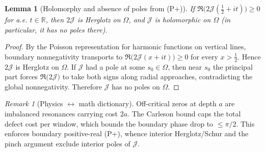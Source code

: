 \documentclass[11pt]{article}
\newtheorem{lemma}[theorem]{Lemma}
\theoremstyle{definition}
\theoremstyle{remark}
\newtheorem{remark}[theorem]{Remark}
\newcommand{\R}{\mathbb{R}}
\begin{document}
\begin{lemma}[Holomorphy and absence of poles from (P+)]\label{lem:Pplus-holomorphy-nopoles}
If \(\Re\big(2\mathcal J(\tfrac12+it)\big)\ge 0\) for a.e. \(t\in\R\), then \(2\mathcal J\) is Herglotz on \(\Omega\), and \(\mathcal J\) is holomorphic on \(\Omega\) (in particular, it has no poles there).
\end{lemma}
\begin{proof}
By the Poisson representation for harmonic functions on vertical lines, boundary nonnegativity transports to \(\Re\big(2\mathcal J(x+it)\big)\ge 0\) for every \(x>\tfrac12\). Hence \(2\mathcal J\) is Herglotz on \(\Omega\). If \(\mathcal J\) had a pole at some \(s_0\in\Omega\), then near \(s_0\) the principal part forces \(\Re\big(2\mathcal J\big)\) to take both signs along radial approaches, contradicting the global nonnegativity. Therefore \(\mathcal J\) has no poles on \(\Omega\).
\end{proof}


\begin{remark}[Physics $\leftrightarrow$ math dictionary]
Off-critical zeros at depth \(a\) are imbalanced resonances carrying cost \(2a\). The Carleson bound caps the total defect cost per window, which bounds the boundary phase drop to \(\le\pi/2\). This enforces boundary positive-real (P+), whence interior Herglotz/Schur and the pinch argument exclude interior poles of \(\mathcal J\).
\end{remark}
\end{document}
